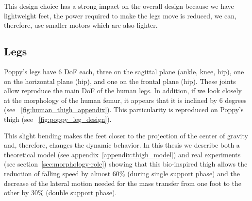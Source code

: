 This design choice has a strong impact on the overall design because we have lightweight feet, the power required to make the legs move is reduced, we can, therefore, use smaller motors which are also lighter.






\subsection{Legs} %
\label{sub:poppy-leg-design}

Poppy's legs have 6 DoF each, three on the sagittal plane (ankle, knee, hip), one on the horizontal plane (hip), and one on the frontal plane (hip). These joints allow reproduce the main DoF of the human legs. In addition, if we look closely at the morphology of the human femur, it appears that it is inclined by 6 degrees (see \figurename~\ref{fig:human_thigh_appendix}). This particularity is reproduced on Poppy's thigh (see \figurename~\ref{fig:poppy_leg_design}).



This slight bending makes the feet closer to the projection of the center of gravity and, therefore, changes the dynamic behavior.
In this thesis we describe both a theoretical model (see appendix~\ref{appendix:thigh_model}) and real experiments (see section~\ref{sec:morphology-role}) showing that this bio-inspired thigh allows the reduction of falling speed by almost 60\% (during single support phase) and the decrease of the lateral motion needed for the mass transfer from one foot to the other by 30\% (double support phase).


